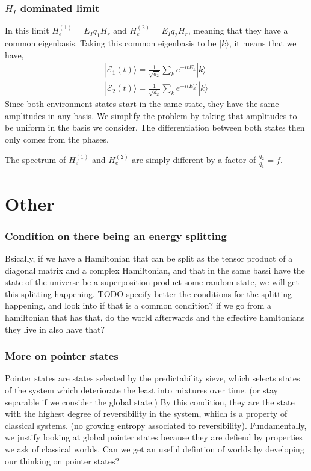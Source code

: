 \documentclass{article}
\begin{document}
\subsubsection{$H_I$ dominated limit}
In this limit $H_e^{(1)}=E_Iq_1H_r$ and $H_e^{(2)}=E_Iq_2H_r$, meaning that they have a common eigenbasis. Taking this common eigenbasis to be $|k\rangle$, it means that we have,
\begin{align}
    |\mathcal{E}_1(t)\rangle=\frac{1}{\sqrt{d_2}}\sum_ke^{-itE_k}|k\rangle\\
    |\mathcal{E}_2(t)\rangle=\frac{1}{\sqrt{d_2}}\sum_ke^{-itE_k'}|k\rangle
\end{align}
Since both environment states start in the same state, they have the same amplitudes in any basis. We simplify the problem by taking that amplitudes to be uniform in the basis we consider. The differentiation between both states then only comes from the phases. 

The spectrum of $H_e^{(1)}$ and $H_e^{(2)}$ are simply different by a factor of $\frac{q_2}{q_1}=f$.





\section{Other}

\subsubsection{Condition on there being an energy splitting}

Bsically, if we have a Hamiltonian that can be split as the tensor product of a diagonal matrix and a complex Hamiltonian, and that in the same bassi have the state of the universe be a superposition product some random state, we will get this splitting happening. TODO specify better the conditions for the splitting happening, and look into if that is a common condition? if we go from a hamiltonian that has that, do the world afterwards and the effective hamltonians they live in also have that?

\subsubsection{More on pointer states}

Pointer states are states selected by the predictability sieve, which selects states of the system which deteriorate the least into mixtures over time. (or stay separable if we consider the global state.) By this condition, they are the state with the highest degree of reversibility in the system, whiich is a property of classical systems. (no growing entropy associated to reversibility). Fundamentally, we justify looking at global pointer states because they are defiend by properties we ask of classical worlds. Can we get an useful defintion of worlds by developing our thinking on pointer states? \\
\end{document}
